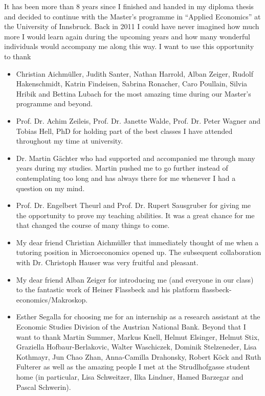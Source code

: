 \documentclass[a4paper,11pt,listof=nochaptergap,oneside,pointednumbers,bibtotoc,bigheadings,liststotoc,hidelinks]{scrbook}
\theoremstyle{mysatz}
\theoremstyle{mydefinition}
\theoremstyle{mytheorem}
\theoremstyle{mybemerkung}
\begin{document}
\newpage
\thispagestyle{empty} %
It has been more than 8 years since I finished and handed in my diploma thesis and decided to continue with the Master's programme in ``Applied Economics'' at the University of Innsbruck. Back in 2011 I could have never imagined how much more I would learn again during the upcoming years and how many wonderful individuals would accompany me along this way. I want to use this opportunity to thank
\begin{itemize}
	\item Christian Aichmüller, Judith Santer, Nathan Harrold, Alban Zeiger, Rudolf Hakenschmidt, Katrin Findeisen, Sabrina Ronacher, Caro Poullain, Silvia Hribik and Bettina Lubach for the most amazing time during our Master's programme and beyond.
	\item Prof. Dr. Achim Zeileis, Prof. Dr. Janette Walde, Prof. Dr. Peter Wagner and Tobias Hell, PhD for holding part of the best classes I have attended throughout my time at university.
	\item Dr. Martin Gächter who had supported and accompanied me through many years during my studies. Martin pushed me to go further instead of contemplating too long and has always there for me whenever I had a question on my mind.
	\item Prof. Dr. Engelbert Theurl and Prof. Dr. Rupert Sausgruber for giving me the opportunity to prove my teaching abilities. It was a great chance for me that changed the course of many things to come.
	\item My dear friend Christian Aichmüller that immediately thought of me when a tutoring position in Microeconomics opened up. The subsequent collaboration with Dr. Christoph Hauser was very fruitful and pleasant.
	\item My dear friend Alban Zeiger for introducing me (and everyone in our class) to the fantastic work of Heiner Flassbeck and his platform flassbeck-economics/Makroskop.
	\item Esther Segalla for choosing me for an internship as a research assistant at the Economic Studies Division of the Austrian National Bank. Beyond that I want to thank Martin Summer, Markus Knell, Helmut Elsinger, Helmut Stix, Graziella Hofbaur-Berlakovic, Walter Waschiczek, Dominik Stelzeneder, Lisa Kothmayr, Jun Chao Zhan, Anna-Camilla Drahonsky, Robert Köck and Ruth Fulterer as well as the amazing people I met at the Strudlhofgasse student home (in particular, Lisa Schweitzer, Ilka Lindner, Hamed Barzegar and Pascal Schwerin).
\end{itemize}	
\end{document}
